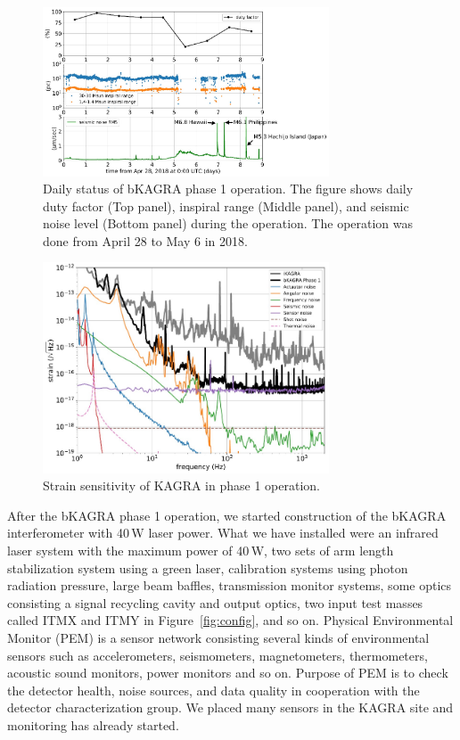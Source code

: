 \begin{figure}
\begin{center}
\includegraphics[width=8.5cm]{astrodiv/gw/overview/fig/dutyfactor.eps}
\caption{Daily status of bKAGRA phase 1 operation\cite{phase1_paper}. The figure shows daily duty factor (Top panel), inspiral range (Middle panel), and seismic noise level (Bottom panel) during the operation. The operation was done from April 28 to May 6 in 2018.}
\label{fig:dutyfactor}
\end{center}
\end{figure}





\begin{figure}
\begin{center}
\includegraphics[width=8.5cm]{astrodiv/gw/overview/fig/phase1_sens.eps}
\caption{Strain sensitivity of KAGRA in phase 1 operation\cite{phase1_paper}. }
\label{fig:phase1_sens}
\end{center}
\end{figure}



After the bKAGRA phase 1 operation, we started construction of the bKAGRA interferometer with 40\,W laser power. What we have installed were an infrared laser system with the maximum power of 40\,W, two sets of arm length stabilization system using a green laser, calibration systems using photon radiation pressure, large beam baffles, transmission monitor systems, some optics consisting a signal recycling cavity and output optics, two input test masses called ITMX and ITMY in Figure~\ref{fig:config}, and so on. Physical Environmental Monitor (PEM) is a sensor network consisting several kinds of environmental sensors such as accelerometers, seismometers, magnetometers, thermometers, acoustic sound monitors, power monitors and so on. Purpose of PEM is to check the detector health, noise sources, and data quality in cooperation with the detector characterization group. We placed many sensors in the KAGRA site and monitoring has already started. 


